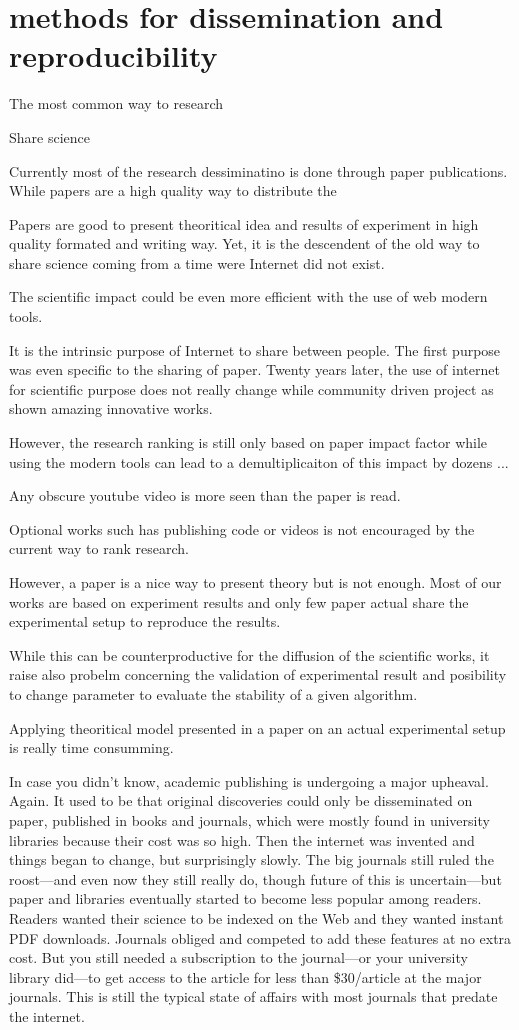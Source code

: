 \section{methods for dissemination and reproducibility} %

The most common way to  research

Share science

Currently most of the research dessiminatino is done through paper publications.
While papers are a high quality way to distribute the

Papers are good to present theoritical idea and results of experiment in high quality formated and writing way.
Yet, it is the descendent of the old way to share science coming from a time were Internet did not exist.

The scientific impact could be even more efficient with the use of web modern tools.

It is the intrinsic purpose of Internet to share between people.
The first purpose was even specific to the sharing of paper.
Twenty years later, the use of internet for scientific purpose does not really change while community driven project as shown amazing innovative works.

However, the research ranking is still only based on paper impact factor while using the modern tools can lead to a demultiplicaiton of this impact by dozens ...

Any obscure youtube video is more seen than the paper is read.

Optional works such has publishing code or videos is not encouraged by the current way to rank research.

However, a paper is a nice way to present theory but is not enough.
Most of our works are based on experiment results and only few paper actual share the experimental setup to reproduce the results.

While this can be counterproductive for the diffusion of the scientific works, it raise also probelm concerning the validation of experimental result and posibility to change parameter to evaluate the stability of a given algorithm.

Applying theoritical model presented in a paper on an actual experimental setup is really time consumming.

In case you didn’t know, academic publishing is undergoing a major upheaval.
Again.
It used to be that original discoveries could only be disseminated on paper, published in books and journals, which were mostly found in university libraries because their cost was so high.
Then the internet was invented and things began to change, but surprisingly slowly.
The big journals still ruled the roost—and even now they still really do, though future of this is uncertain—but paper and libraries eventually started to become less popular among readers.
Readers wanted their science to be indexed on the Web and they wanted instant PDF downloads.
Journals obliged and competed to add these features at no extra cost.
But you still needed a subscription to the journal—or your university library did—to get access to the article for less than \$30/article at the major journals.
This is still the typical state of affairs with most journals that predate the internet.

